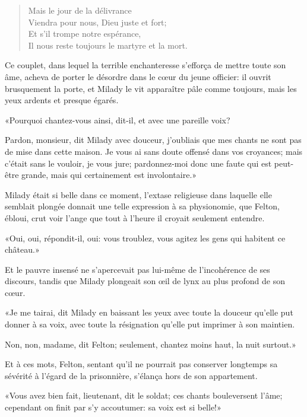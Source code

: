\begin{verse}
	Mais le jour de la délivrance\\
	Viendra pour nous, Dieu juste et fort;\\
	Et s'il trompe notre espérance,\\
	Il nous reste toujours le martyre et la mort. 
\end{verse}

Ce couplet, dans lequel la terrible enchanteresse s'efforça de mettre toute son âme, acheva de porter le désordre dans le cœur du jeune officier: il ouvrit brusquement la porte, et Milady le vit apparaître pâle comme toujours, mais les yeux ardents et presque égarés. 

«Pourquoi chantez-vous ainsi, dit-il, et avec une pareille voix? 

\speak  Pardon, monsieur, dit Milady avec douceur, j'oubliais que mes chants ne sont pas de mise dans cette maison. Je vous ai sans doute offensé dans vos croyances; mais c'était sans le vouloir, je vous jure; pardonnez-moi donc une faute qui est peut-être grande, mais qui certainement est involontaire.» 

Milady était si belle dans ce moment, l'extase religieuse dans laquelle elle semblait plongée donnait une telle expression à sa physionomie, que Felton, ébloui, crut voir l'ange que tout à l'heure il croyait seulement entendre. 

«Oui, oui, répondit-il, oui: vous troublez, vous agitez les gens qui habitent ce château.» 

Et le pauvre insensé ne s'apercevait pas lui-même de l'incohérence de ses discours, tandis que Milady plongeait son œil de lynx au plus profond de son cœur. 

«Je me tairai, dit Milady en baissant les yeux avec toute la douceur qu'elle put donner à sa voix, avec toute la résignation qu'elle put imprimer à son maintien. 

\speak  Non, non, madame, dit Felton; seulement, chantez moins haut, la nuit surtout.» 

Et à ces mots, Felton, sentant qu'il ne pourrait pas conserver longtemps sa sévérité à l'égard de la prisonnière, s'élança hors de son appartement. 

«Vous avez bien fait, lieutenant, dit le soldat; ces chants bouleversent l'âme; cependant on finit par s'y accoutumer: sa voix est si belle!» 